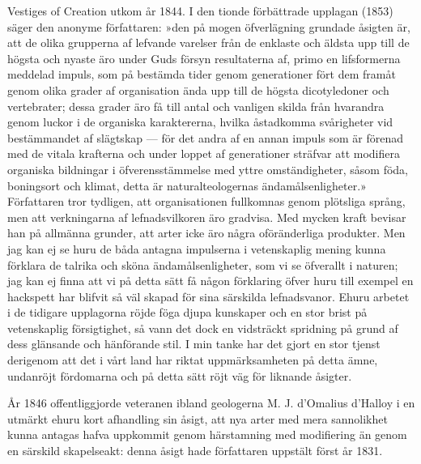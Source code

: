 Vestiges of Creation utkom år 1844. I den tionde förbättrade upplagan (1853) säger den anonyme författaren: »den på mogen öfverlägning grundade åsigten är, att de olika grupperna af lefvande varelser från de enklaste och äldsta upp till de högsta och nyaste äro under Guds försyn resultaterna af, primo en lifsformerna meddelad impuls, som på bestämda tider genom generationer fört dem framåt genom olika grader af organisation ända upp till de högsta dicotyledoner och vertebrater; dessa grader äro få till antal och vanligen skilda från hvarandra genom luckor i de organiska karaktererna, hvilka åstadkomma svårigheter vid bestämmandet af slägtskap — för det andra af en annan impuls som är förenad med de vitala krafterna och under loppet af generationer sträfvar att modifiera organiska bildningar i öfverensstämmelse med yttre omständigheter, såsom föda, boningsort och klimat, detta är naturalteologernas ändamålsenligheter.» Författaren tror tydligen, att organisationen fullkomnas genom plötsliga språng, men att verkningarna af lefnadsvilkoren äro gradvisa. Med mycken kraft bevisar han på allmänna grunder, att arter icke äro några oföränderliga produkter. Men jag kan ej se huru de båda antagna impulserna i vetenskaplig mening kunna förklara de talrika och sköna ändamålsenligheter, som vi se öfverallt i naturen; jag kan ej finna att vi på detta sätt få någon förklaring öfver huru till exempel en hackspett har blifvit så väl skapad för sina särskilda lefnadsvanor. Ehuru arbetet i de tidigare upplagorna röjde föga djupa kunskaper och en stor brist på vetenskaplig försigtighet, så vann det dock en vidsträckt spridning på grund af dess glänsande och hänförande stil. I min tanke har det gjort en stor tjenst derigenom att det i vårt land har riktat uppmärksamheten på detta ämne, undanröjt fördomarna och på detta sätt röjt väg för liknande åsigter.

År 1846 offentliggjorde veteranen ibland geologerna M. J. d’Omalius d’Halloy i en utmärkt ehuru kort afhandling sin åsigt, att nya arter med mera sannolikhet kunna antagas hafva uppkommit genom härstamning med modifiering än genom en särskild skapelseakt: denna åsigt hade författaren uppstält först år 1831.

